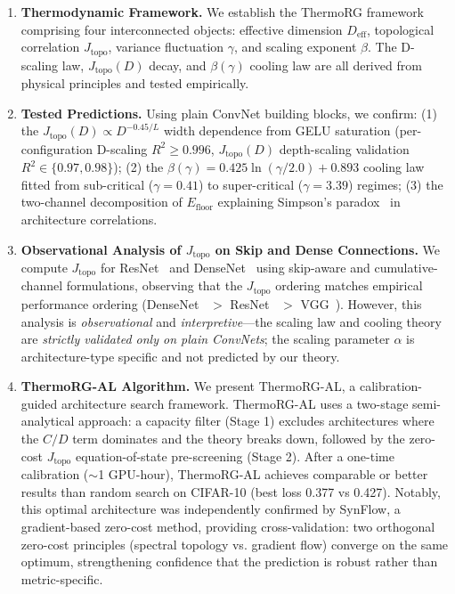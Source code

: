 \documentclass[11pt, a4paper]{article}
\theoremstyle{plain}
\begin{document}
\begin{enumerate}
\item \textbf{Thermodynamic Framework.} We establish the ThermoRG framework comprising four interconnected objects: effective dimension $D_{\mathrm{eff}}$, topological correlation $J_{\mathrm{topo}}$, variance fluctuation $\gamma$, and scaling exponent $\beta$. The D-scaling law, $J_{\mathrm{topo}}(D)$ decay, and $\beta(\gamma)$ cooling law are all derived from physical principles and tested empirically.

\item \textbf{Tested Predictions.} Using plain ConvNet building blocks, we confirm: (1) the $J_{\mathrm{topo}}(D) \propto D^{-0.45/L}$ width dependence from GELU saturation (per-configuration D-scaling $R^2 \ge 0.996$, $J_{\mathrm{topo}}(D)$ depth-scaling validation $R^2 \in \{0.97, 0.98\}$); (2) the $\beta(\gamma) = 0.425\ln(\gamma/2.0) + 0.893$ cooling law fitted from sub-critical ($\gamma=0.41$) to super-critical ($\gamma=3.39$) regimes; (3) the two-channel decomposition of $E_{\mathrm{floor}}$ explaining Simpson's paradox~\citep{blyth1972simpson} in architecture correlations.

\item \textbf{Observational Analysis of $J_{\mathrm{topo}}$ on Skip and Dense Connections.} We compute $J_{\mathrm{topo}}$ for ResNet~\citep{he2016deep} and DenseNet~\citep{huang2017densenet} using skip-aware and cumulative-channel formulations, observing that the $J_{\mathrm{topo}}$ ordering matches empirical performance ordering (DenseNet~\citep{huang2017densenet} $>$ ResNet~\citep{he2016deep} $>$ VGG~\citep{simonyan2015very}). However, this analysis is \emph{observational} and \emph{interpretive}---the scaling law and cooling theory are \emph{strictly validated only on plain ConvNets}; the scaling parameter $\alpha$ is architecture-type specific and not predicted by our theory.

\item \textbf{ThermoRG-AL Algorithm.} We present ThermoRG-AL, a calibration-guided architecture search framework. ThermoRG-AL uses a two-stage semi-analytical approach: a capacity filter (Stage 1) excludes architectures where the $C/D$ term dominates and the theory breaks down, followed by the zero-cost $J_{\mathrm{topo}}$ equation-of-state pre-screening (Stage 2). After a one-time calibration ($\sim$1 GPU-hour), ThermoRG-AL achieves comparable or better results than random search on CIFAR-10 (best loss 0.377 vs 0.427). Notably, this optimal architecture was independently confirmed by SynFlow, a gradient-based zero-cost method, providing cross-validation: two orthogonal zero-cost principles (spectral topology vs. gradient flow) converge on the same optimum, strengthening confidence that the prediction is robust rather than metric-specific.
\end{enumerate}
\end{document}
